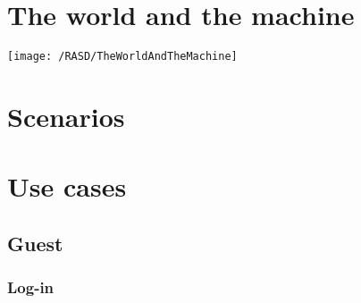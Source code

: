 \section{The world and the machine}

\begin{center}
	\vspace{0.2cm}
	\texttt{[image: /RASD/TheWorldAndTheMachine]}\\ 
	\vspace{0.5cm}
\end{center}


\section{Scenarios}

\section{Use cases}


\subsection{Guest}


\subsubsection{Log-in}

